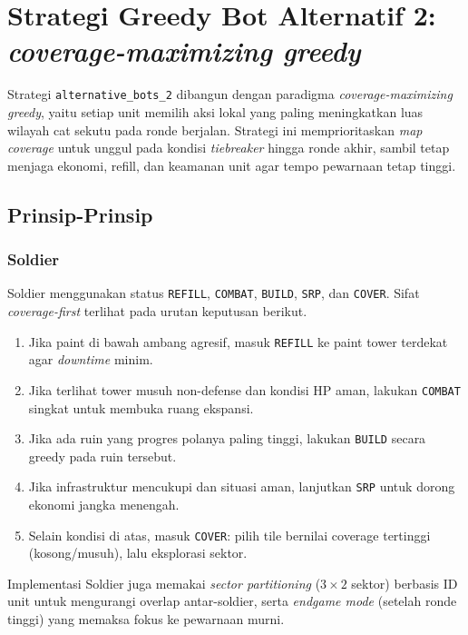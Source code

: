 \section{Strategi Greedy Bot Alternatif 2: \textit{coverage-maximizing greedy}}

Strategi \texttt{alternative\_bots\_2} dibangun dengan paradigma \textit{coverage-maximizing greedy}, yaitu setiap unit memilih aksi lokal yang paling meningkatkan luas wilayah cat sekutu pada ronde berjalan. Strategi ini memprioritaskan \textit{map coverage} untuk unggul pada kondisi \textit{tiebreaker} hingga ronde akhir, sambil tetap menjaga ekonomi, refill, dan keamanan unit agar tempo pewarnaan tetap tinggi.

\subsection{Prinsip-Prinsip}

\subsubsection{Soldier}

Soldier menggunakan status \texttt{REFILL}, \texttt{COMBAT}, \texttt{BUILD}, \texttt{SRP}, dan \texttt{COVER}. Sifat \textit{coverage-first} terlihat pada urutan keputusan berikut.

\begin{enumerate}
    \item Jika paint di bawah ambang agresif, masuk \texttt{REFILL} ke paint tower terdekat agar \textit{downtime} minim.
    \item Jika terlihat tower musuh non-defense dan kondisi HP aman, lakukan \texttt{COMBAT} singkat untuk membuka ruang ekspansi.
    \item Jika ada ruin yang progres polanya paling tinggi, lakukan \texttt{BUILD} secara greedy pada ruin tersebut.
    \item Jika infrastruktur mencukupi dan situasi aman, lanjutkan \texttt{SRP} untuk dorong ekonomi jangka menengah.
    \item Selain kondisi di atas, masuk \texttt{COVER}: pilih tile bernilai coverage tertinggi (kosong/musuh), lalu eksplorasi sektor.
\end{enumerate}

Implementasi Soldier juga memakai \textit{sector partitioning} ($3\times2$ sektor) berbasis ID unit untuk mengurangi overlap antar-soldier, serta \textit{endgame mode} (setelah ronde tinggi) yang memaksa fokus ke pewarnaan murni.

